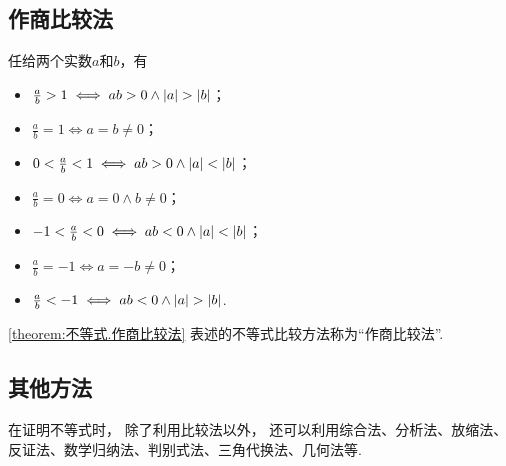 \subsection{作商比较法}
\begin{theorem}\label{theorem:不等式.作商比较法}
任给两个实数\(a\)和\(b\)，有\begin{itemize}
	\item \(\frac{a}{b} > 1 \iff ab > 0 \land \abs{a} > \abs{b}\)；
	\item \(\frac{a}{b} = 1 \iff a = b \neq 0\)；
	\item \(0 < \frac{a}{b} < 1 \iff ab > 0 \land \abs{a} < \abs{b}\)；
	\item \(\frac{a}{b} = 0 \iff a = 0 \land b \neq 0\)；
	\item \(-1 < \frac{a}{b} < 0 \iff ab < 0 \land \abs{a} < \abs{b}\)；
	\item \(\frac{a}{b} = -1 \iff a = -b \neq 0\)；
	\item \(\frac{a}{b} < -1 \iff ab < 0 \land \abs{a} > \abs{b}\).
\end{itemize}
\end{theorem}
\cref{theorem:不等式.作商比较法} 表述的不等式比较方法称为“作商比较法”.

\subsection{其他方法}
在证明不等式时，
除了利用比较法以外，
还可以利用综合法、分析法、放缩法、反证法、数学归纳法、判别式法、三角代换法、几何法等.
